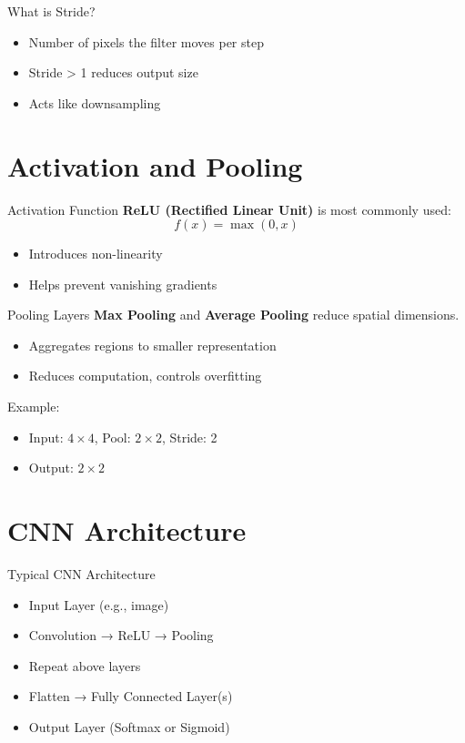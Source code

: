\documentclass{beamer}
\begin{document}
\begin{frame}{What is Stride?}
\begin{itemize}
    \item Number of pixels the filter moves per step
    \item Stride > 1 reduces output size
    \item Acts like downsampling
\end{itemize}
\end{frame}

\section{Activation and Pooling}
\begin{frame}{Activation Function}
\textbf{ReLU (Rectified Linear Unit)} is most commonly used:
\[
f(x) = \max(0, x)
\]
\begin{itemize}
    \item Introduces non-linearity
    \item Helps prevent vanishing gradients
\end{itemize}
\end{frame}

\begin{frame}{Pooling Layers}
\textbf{Max Pooling} and \textbf{Average Pooling} reduce spatial dimensions.
\begin{itemize}
    \item Aggregates regions to smaller representation
    \item Reduces computation, controls overfitting
\end{itemize}
Example:
\begin{itemize}
    \item Input: \( 4 \times 4 \), Pool: \( 2 \times 2 \), Stride: 2
    \item Output: \( 2 \times 2 \)
\end{itemize}
\end{frame}

\section{CNN Architecture}
\begin{frame}{Typical CNN Architecture}
\begin{itemize}
    \item Input Layer (e.g., image)
    \item Convolution → ReLU → Pooling
    \item Repeat above layers
    \item Flatten → Fully Connected Layer(s)
    \item Output Layer (Softmax or Sigmoid)
\end{itemize}
\end{frame}
\end{document}
